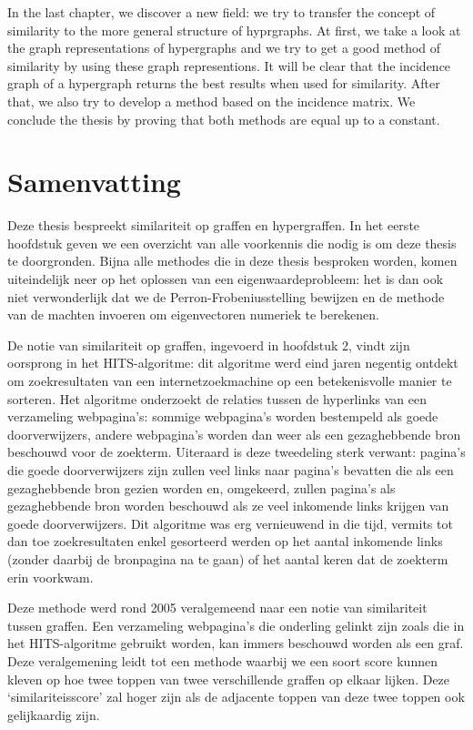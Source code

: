 \documentclass[a4paper,11pt]{report}
\begin{document}
In the last chapter, we discover a new field: we try to transfer the concept of similarity to the more
general structure of hyprgraphs. At first, we take a look at the graph 
representations of hypergraphs and we try to get a good method of similarity by 
using these graph representions. It will be clear that the incidence graph of a 
hypergraph returns the best results when used for similarity. After that, we 
also try to develop a method based on the incidence matrix. We conclude the 
thesis by proving that both methods are equal up to a constant.



\chapter*{Samenvatting}
Deze thesis bespreekt similariteit op graffen en hypergraffen. In het eerste 
hoofdstuk geven we een overzicht van alle voorkennis die nodig is om deze thesis 
te doorgronden. Bijna alle methodes die in deze thesis besproken worden, komen 
uiteindelijk neer op het oplossen van een eigenwaardeprobleem: het is dan ook 
niet verwonderlijk dat we de Perron-Frobeniusstelling bewijzen en de methode van 
de machten invoeren om eigenvectoren numeriek te berekenen.


De notie van 
similariteit op graffen, ingevoerd in hoofdstuk 2, vindt zijn oorsprong in het HITS-algoritme: dit algoritme 
werd eind jaren negentig ontdekt om zoekresultaten van een internetzoekmachine op een betekenisvolle manier 
te sorteren. Het algoritme onderzoekt de relaties tussen de hyperlinks van een verzameling webpagina's: sommige webpagina's worden 
bestempeld als goede doorverwijzers, andere webpagina's worden dan weer als een gezaghebbende bron beschouwd voor de zoekterm. 
Uiteraard is deze tweedeling sterk verwant: pagina's die goede doorverwijzers 
zijn zullen veel links naar pagina's bevatten die als een gezaghebbende bron 
gezien worden en, omgekeerd, zullen pagina's als gezaghebbende bron worden 
beschouwd als ze veel inkomende links krijgen van goede doorverwijzers. Dit 
algoritme was erg vernieuwend in die tijd, vermits tot dan toe zoekresultaten 
enkel gesorteerd werden op het aantal inkomende links (zonder daarbij de bronpagina na te gaan) 
of het aantal keren dat de zoekterm erin voorkwam.

Deze methode werd rond 2005 veralgemeend naar een notie van similariteit tussen 
graffen. Een verzameling webpagina's die onderling gelinkt zijn zoals die in het HITS-algoritme gebruikt worden,
kan immers beschouwd worden als een graf. Deze veralgemening leidt tot een 
methode waarbij we een soort score kunnen kleven op hoe twee toppen van twee verschillende graffen op elkaar lijken. 
Deze `similariteisscore' zal hoger zijn als de adjacente toppen van deze twee toppen 
ook gelijkaardig zijn.
\end{document}
